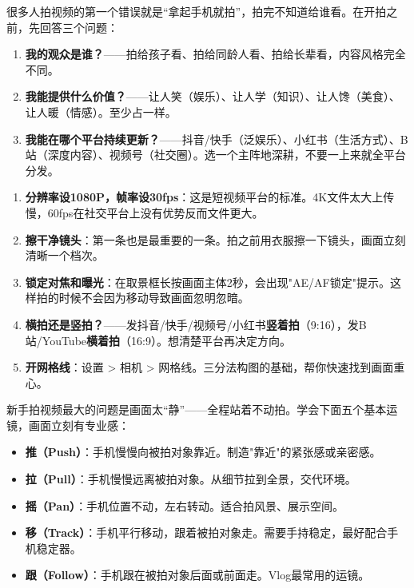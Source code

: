 


很多人拍视频的第一个错误就是“拿起手机就拍”，拍完不知道给谁看。在开拍之前，先回答三个问题：

\begin{enumerate}
  \item \textbf{我的观众是谁？}——拍给孩子看、拍给同龄人看、拍给长辈看，内容风格完全不同。
  \item \textbf{我能提供什么价值？}——让人笑（娱乐）、让人学（知识）、让人馋（美食）、让人暖（情感）。至少占一样。
  \item \textbf{我能在哪个平台持续更新？}——抖音/快手（泛娱乐）、小红书（生活方式）、B站（深度内容）、视频号（社交圈）。选一个主阵地深耕，不要一上来就全平台分发。
\end{enumerate}


\begin{enumerate}
  \item \textbf{分辨率设1080P，帧率设30fps}：这是短视频平台的标准。4K文件太大上传慢，60fps在社交平台上没有优势反而文件更大。
  \item \textbf{擦干净镜头}：第一条也是最重要的一条。拍之前用衣服擦一下镜头，画面立刻清晰一个档次。
  \item \textbf{锁定对焦和曝光}：在取景框长按画面主体2秒，会出现"AE/AF锁定"提示。这样拍的时候不会因为移动导致画面忽明忽暗。
  \item \textbf{横拍还是竖拍？}——发抖音/快手/视频号/小红书\textbf{竖着拍}（9:16），发B站/YouTube\textbf{横着拍}（16:9）。想清楚平台再决定方向。
  \item \textbf{开网格线}：设置 > 相机 > 网格线。三分法构图的基础，帮你快速找到画面重心。
\end{enumerate}


新手拍视频最大的问题是画面太“静”——全程站着不动拍。学会下面五个基本运镜，画面立刻有专业感：

\begin{itemize}
  \item \textbf{推（Push）}：手机慢慢向被拍对象靠近。制造"靠近"的紧张感或亲密感。
  \item \textbf{拉（Pull）}：手机慢慢远离被拍对象。从细节拉到全景，交代环境。
  \item \textbf{摇（Pan）}：手机位置不动，左右转动。适合拍风景、展示空间。
  \item \textbf{移（Track）}：手机平行移动，跟着被拍对象走。需要手持稳定，最好配合手机稳定器。
  \item \textbf{跟（Follow）}：手机跟在被拍对象后面或前面走。Vlog最常用的运镜。
\end{itemize}

